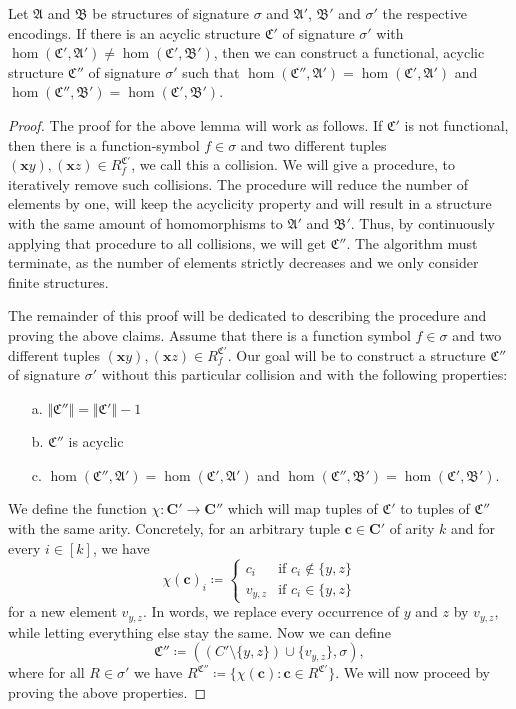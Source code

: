 \begin{lemma}
	Let $\mathfrak A$ and $\mathfrak B$ be structures of signature $\sigma$ and $\mathfrak A'$, $\mathfrak B'$ and $\sigma'$ the respective encodings.
	If there is an acyclic structure $\mathfrak C'$ of signature $\sigma'$ with $\hom(\mathfrak C',\mathfrak A')\neq\hom(\mathfrak C',\mathfrak B')$, then we can construct a functional, acyclic structure $\mathfrak C''$ of signature $\sigma'$ such that $\hom(\mathfrak C'',\mathfrak A')=\hom(\mathfrak C',\mathfrak A')$ and $\hom(\mathfrak C'',\mathfrak B')=\hom(\mathfrak C',\mathfrak B')$.
	\label{lem:constructionOfFunctionalStruct}
\end{lemma}
\begin{proof}
	The proof for the above lemma will work as follows.
	If $\mathfrak C'$ is not functional, then there is a function-symbol $f\in\sigma$ and two different tuples $(\mathbf xy),(\mathbf xz)\in R^{\mathfrak C'}_f$, we call this a collision.
	We will give a procedure, to iteratively remove such collisions.
	The procedure will reduce the number of elements by one, will keep the acyclicity property and will result in a structure with the same amount of homomorphisms to $\mathfrak A'$ and $\mathfrak B'$.
	Thus, by continuously applying that procedure to all collisions, we will get $\mathfrak C''$.
	The algorithm must terminate, as the number of elements strictly decreases and we only consider finite structures.
	
	The remainder of this proof will be dedicated to describing the procedure and proving the above claims.
	Assume that there is a function symbol $f\in \sigma$ and two different tuples $(\mathbf x y),(\mathbf x z)\in R_f^{\mathfrak C'}$. 
	Our goal will be to construct a structure $\mathfrak C''$ of signature $\sigma'$ without this particular collision and with the following properties:
	\begin{itemize}
		\item[a.] $\Vert \mathfrak C'' \Vert = \Vert \mathfrak C'\Vert -1$
		\item[b.] $\mathfrak C''$ is acyclic
		\item[c.] $\hom(\mathfrak C'',\mathfrak A')=\hom(\mathfrak C',\mathfrak A')$ and $\hom(\mathfrak C'',\mathfrak B')=\hom(\mathfrak C',\mathfrak B')$.
	\end{itemize}
	We define the function $\chi : \mathbf{C'}\to\mathbf{C''}$ which will map tuples of $\mathfrak C'$ to tuples of $\mathfrak C''$ with the same arity.
	Concretely, for an arbitrary tuple $\mathbf c\in \mathbf{C'}$ of arity $k$ and for every $i\in[k]$, we have
	$$\chi(\mathbf c)_i \coloneqq \begin{cases}
		c_i & \text{if } c_i\notin \{y,z\} \\
		v_{y,z} & \text{if } c_i \in \{y,z\}
	\end{cases}$$
	for a new element $v_{y,z}$.
	In words, we replace every occurrence of $y$ and $z$ by $v_{y,z}$, while letting everything else stay the same.
	Now we can define 
	$$\mathfrak C'' \coloneqq ((C' \setminus \{y,z\})\cup \{v_{y,z}\}, \sigma),$$
	where for all $R\in\sigma'$ we have $R^{\mathfrak C''}\coloneqq \{\chi(\mathbf c) : \mathbf c\in R^{\mathfrak C'}\}$.
	We will now proceed by proving the above properties.
	

\end{proof}
